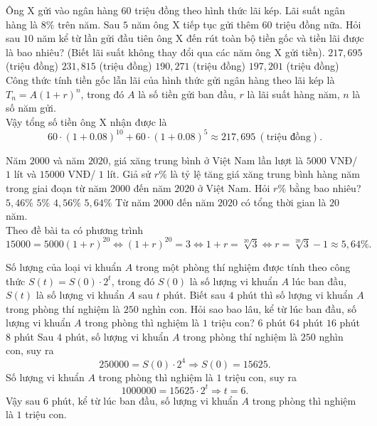\begin{ex}
	Ông X gửi vào ngân hàng $60$ triệu đồng theo hình thức lãi kép. Lãi suất ngân hàng là  $8\%$ trên năm. Sau $5$ năm ông X tiếp tục gửi thêm $60$ triệu đồng nữa. Hỏi sau $10$ năm kể từ lần gửi đầu tiên ông X đến rút toàn bộ tiền gốc và tiền lãi được là bao nhiêu? (Biết lãi suất không thay đổi qua các năm ông X gửi tiền).
	\choice
	{\True $217{,}695$ (triệu đồng)}
	{$231{,}815$ (triệu đồng)}
	{$190{,}271$ (triệu đồng)}
	{$197{,}201$ (triệu đồng)}
	\loigiai
	{Công thức tính tiền gốc lẫn lãi của hình thức gửi ngân hàng theo lãi kép là $T_n=A(1+r)^n$, trong đó $A$ là số tiền gửi ban đầu, $r$ là lãi suất hàng năm, $n$ là số năm gửi.\\
		Vậy tổng số tiền ông X nhận được là $$60\cdot (1+0.08)^{10}+60\cdot (1+0.08)^5\approx 217{,}695\ (\text{triệu đồng}).$$
	}
\end{ex}

\begin{ex}
	Năm $2000$ và năm $2020$, giá xăng trung bình ở Việt Nam lần lượt là $5000$ VNĐ/ $1$ lít và $15000$ VNĐ/ $1$ lít. Giả sử $r\%$ là tỷ lệ tăng giá xăng trung bình hàng năm trong giai đoạn từ năm $2000$ đến năm $2020$ ở Việt Nam. Hỏi $r\%$ bằng bao nhiêu?
	\choice
	{$5{,}46\%$}
	{$5\%$}
	{$4{,}56\%$}
	{\True $5{,}64\%$}
	\loigiai
	{
		Từ năm $2000$ đến năm $2020$ có tổng thời gian là $20$ năm.\\
		Theo đề bài ta có phương trình
		\[15000=5000(1+r)^{20}\Leftrightarrow (1+r)^{20}=3\Leftrightarrow 1+r=\sqrt[20]{3}\Leftrightarrow r=\sqrt[20]{3}-1\approx 5{,}64\%.\]
	}
\end{ex}

\begin{ex}
	Số lượng của loại vi khuẩn $A$ trong một phòng thí nghiệm được tính theo công thức $S(t)=S(0)\cdot 2^t$, trong đó $S(0)$ là số lượng vi khuẩn $A$ lúc ban đầu, $S(t)$ là số lượng vi khuẩn $A$ sau $t$ phút. Biết sau $4$ phút thì số lượng vi khuẩn $A$ trong phòng thí nghiệm là $250$ nghìn con. Hỏi sao bao lâu, kể từ lúc ban đầu, số lượng vi khuẩn $A$ trong phòng thì nghiệm là $1$ triệu con?
	\choice
	{\True $6$ phút}
	{$64$ phút}
	{$16$ phút}
	{$8$ phút}
	\loigiai
	{
		Sau $4$ phút, số lượng vi khuẩn $A$ trong phòng thí nghiệm là $250$ nghìn con, suy ra 
		\[250000=S(0)\cdot2^4 \Rightarrow S(0)=15625.\]
		Số lượng vi khuẩn $A$ trong phòng thì nghiệm là $1$ triệu con, suy ra
		\[1000000=15625\cdot2^t \Rightarrow t=6.\]
		Vậy sau $6$ phút, kể từ lúc ban đầu, số lượng vi khuẩn $A$ trong phòng thì nghiệm là $1$ triệu con.
	}
\end{ex}

